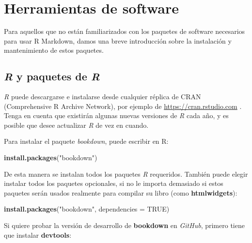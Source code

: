 \documentclass[12pt,]{krantz}
\makeatletter
\newenvironment{Shaded}{\begin{snugshade}}{\end{snugshade}}
\newcommand{\DataTypeTok}[1]{\textcolor[rgb]{0.13,0.29,0.53}{#1}}
\newcommand{\KeywordTok}[1]{\textcolor[rgb]{0.13,0.29,0.53}{\textbf{#1}}}
\newcommand{\NormalTok}[1]{#1}
\newcommand{\OtherTok}[1]{\textcolor[rgb]{0.56,0.35,0.01}{#1}}
\newcommand{\StringTok}[1]{\textcolor[rgb]{0.31,0.60,0.02}{#1}}
\newenvironment{kframe}{%
\medskip{}
\setlength{\fboxsep}{.8em}
 \def\at@end@of@kframe{}%
 \ifinner\ifhmode%
  \def\at@end@of@kframe{\end{minipage}}%
  \begin{minipage}{\columnwidth}%
 \fi\fi%
 \def\FrameCommand##1{\hskip\@totalleftmargin \hskip-\fboxsep
 \colorbox{shadecolor}{##1}\hskip-\fboxsep
     \hskip-\linewidth \hskip-\@totalleftmargin \hskip\columnwidth}%
 \MakeFramed {\advance\hsize-\width
   \@totalleftmargin\z@ \linewidth\hsize
   \@setminipage}}%
 {\par\unskip\endMakeFramed%
 \at@end@of@kframe}
\renewenvironment{Shaded}{\begin{kframe}}{\end{kframe}}
\makeatother
\begin{document}
\cleardoublepage

\hypertarget{appendix-apendice}{%
\appendix {}}


\hypertarget{herramientas-de-software}{%
\chapter{Herramientas de software}\label{herramientas-de-software}}

Para aquellos que no están familiarizados con los paquetes de software necesarios para usar R Markdown, damos una breve introducción sobre la instalación y mantenimiento de estos paquetes.

\hypertarget{r-y-paquetes-de-r}{%
\section{\texorpdfstring{\emph{R} y paquetes de \emph{R}}{R y paquetes de R}}\label{r-y-paquetes-de-r}}

\emph{R} puede descargarse e instalarse desde cualquier réplica de CRAN (Comprehensive R Archive Network), por ejemplo de \url{https://cran.rstudio.com} . Tenga en cuenta que existirán algunas nuevas versiones de \emph{R} cada año, y es posible que desee actualizar \emph{R} de vez en cuando.

Para instalar el paquete \emph{bookdown}, puede escribir en R:

\begin{Shaded}
\begin{Highlighting}[]
\KeywordTok{install.packages}\NormalTok{(}\StringTok{"bookdown"}\NormalTok{)}
\end{Highlighting}
\end{Shaded}

De esta manera se instalan todos los paquetes \emph{R} requeridos. También puede elegir instalar todos los paquetes opcionales, si no le importa demasiado si estos paquetes serán usados realmente para compilar su libro (como \textbf{htmlwidgets}):

\begin{Shaded}
\begin{Highlighting}[]
\KeywordTok{install.packages}\NormalTok{(}\StringTok{"bookdown"}\NormalTok{, }\DataTypeTok{dependencies =} \OtherTok{TRUE}\NormalTok{)}
\end{Highlighting}
\end{Shaded}

Si quiere probar la versión de desarrollo de \textbf{bookdown} en \emph{GitHub}, primero tiene que instalar \textbf{devtools}:
\end{document}
